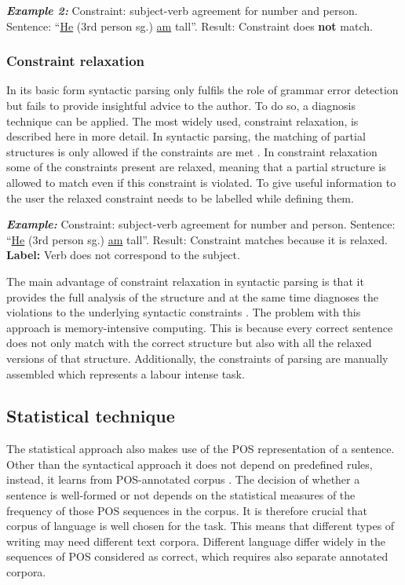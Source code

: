 \documentclass[runningheads]{llncs}
\begin{document}
\textbf{\textit{Example 2:}} Constraint: subject-verb agreement for number and person. Sentence: ``\underline{He} (3rd person sg.) \underline{am} tall''. Result: Constraint does \textbf{not} match.

\subsubsection{Constraint relaxation}
In its basic form syntactic parsing only fulfils the role of grammar error detection but fails to provide insightful advice to the author. To do so, a diagnosis technique can be applied. The most widely used, constraint relaxation, is described here in more detail. In syntactic parsing, the matching of partial structures is only allowed if the constraints are met \citep{vandeventer_creating_2001}. In constraint relaxation some of the constraints present are relaxed, meaning that a partial structure is allowed to match even if this constraint is violated. To give useful information to the user the relaxed constraint needs to be labelled while defining them. 

\textbf{\textit{Example:}} Constraint: subject-verb agreement for number and person. Sentence: ``\underline{He} (3rd person sg.) \underline{am} tall''. Result: Constraint matches because it is relaxed. \textbf{Label:} Verb does not correspond to the subject.

The main advantage of constraint relaxation in syntactic parsing is that it provides the full analysis of the structure and at the same time diagnoses the violations to the underlying syntactic constraints \citep{vandeventer_creating_2001}. The problem with this approach is memory-intensive computing. This is because every correct sentence does not only match with the correct structure but also with all the relaxed versions of that structure. Additionally, the constraints of parsing are manually assembled which represents a labour intense task. 

\subsection{Statistical technique}
The statistical approach also makes use of the POS representation of a sentence. Other than the syntactical approach it does not depend on predefined rules, instead, it learns from POS-annotated corpus \citep{manchanda_various_2016}. The decision of whether a sentence is well-formed or not depends on the statistical measures of the frequency of those POS sequences in the corpus. It is therefore crucial that corpus of language is well chosen for the task. This means that different types of writing may need different text corpora. Different language differ widely in the sequences of POS considered as correct, which requires also separate annotated corpora.
\end{document}
